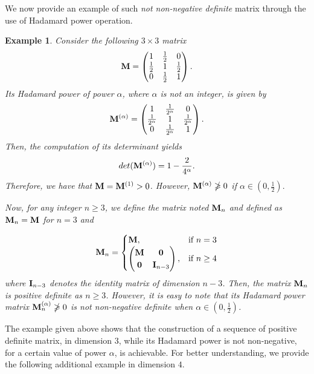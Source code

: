 \documentclass[conference,letterpaper]{IEEEtran}
\numberwithin{equation}{section}
\newcommand{\bd}{\bold}
\newcommand{\beaa}{\begin{eqnarray*}}
\newcommand{\eeaa}{\end{eqnarray*}}
\newtheorem{example}{{\sc Example}}[section]
\begin{document}
\medskip

We now provide an example of such \emph{not non-negative definite} matrix through the use of Hadamard power operation.
\medskip
\begin{example} Consider  the following $3\times 3$ matrix
\beaa
\bd{M}=
\begin{pmatrix}
1 & \frac{1}{2} & 0\\
\frac{1}{2} & 1 & \frac{1}{2}\\
0 & \frac{1}{2} & 1
\end{pmatrix}
.
\eeaa
Its Hadamard power of power $\alpha$, where $\alpha$ is not an integer, is given by
\beaa
\bd{M}^{(\alpha)}=
\begin{pmatrix}
1 & \frac{1}{2^{\alpha}} & 0\\
\frac{1}{2^{\alpha}} & 1 & \frac{1}{2^{\alpha}}\\
0 & \frac{1}{2^{\alpha}} & 1
\end{pmatrix}
.
\eeaa
 Then, the computation of its determinant yields
\beaa
\mbox{det}(\bd{M}^{(\alpha)})=1-\frac{2}{4^{\alpha}}.
\eeaa
Therefore, we have that $\bd{M}=\bd{M}^{(1)}>0$. 
However, $\bd{M}^{(\alpha)}\ngeqslant 0$ if $\alpha \in (0, \frac{1}{2}).$

Now, for any integer $n\geq 3$, we define the matrix noted $\bd{M}_n$ and defined as 
$\bd{M}_n=\bd{M}$ for $n=3$ and

\[
    \bd{M}_n= 
\begin{cases}
    \bd{M},& \text{if } n=3\\
    \begin{pmatrix}
\bd{M} & \bd{0}\\
\bd{0} & \bd{I}_{n-3}
\end{pmatrix},              & \text{if } n\geq 4
\end{cases}
\]
where $\bd{I}_{n-3}$ denotes the identity matrix of dimension $n-3$.
Then,  the matrix $\bd{M}_n$ is positive definite as $n\geq 3$. 
However, it is easy to note that its Hadamard power matrix $\bd{M}_n^{(\alpha)}\ngeqslant 0$ is not non-negative definite when $\alpha \in (0, \frac{1}{2})$.
\end{example}

\medskip

The example given above shows that the construction of a sequence of positive definite matrix, in dimension $3$, while its Hadamard power is not non-negative, for a certain value of power $\alpha$, is achievable. 
For better understanding, we provide the following additional example in dimension $4$. 
\end{document}
